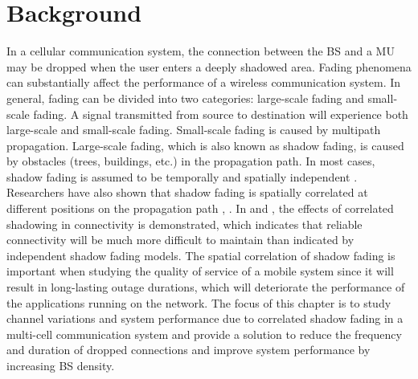 \section{Background}
\par In a cellular communication system, the connection between the BS and a MU may be dropped when the user enters a deeply shadowed area. Fading phenomena can substantially affect the performance of a wireless communication system. In general, fading can be divided into two categories: large-scale fading and small-scale fading. A signal transmitted from source to destination will experience both large-scale and small-scale fading. Small-scale fading is caused by multipath propagation. Large-scale fading, which is also known as shadow fading, is caused by obstacles (trees, buildings, etc.) in the propagation path. In most cases, shadow fading is assumed to be temporally and spatially independent \cite{rappaport1996wireless}.  Researchers have also shown that shadow fading is spatially correlated at different positions on the propagation path \cite{gudmundson1991correlation}, \cite{zhang2008novel}. In \cite{fabbri2009impact} and \cite{patwari2008effects}, the effects of correlated shadowing in connectivity is demonstrated, which indicates that reliable connectivity will be much more difficult to maintain than indicated by independent shadow fading models. The spatial correlation of shadow fading is important when studying the quality of service of a mobile system since it will result in long-lasting outage durations, which will deteriorate the performance of the applications running on the network. The focus of this chapter is to study channel variations and system performance due to correlated shadow fading in a multi-cell communication system and provide a solution to reduce the frequency and duration of dropped connections and improve system performance by increasing BS density.
